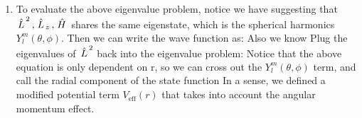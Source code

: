 \documentclass{school-22.101-notes}
\begin{document}
\begin{enumerate}
\item To evaluate the above eigenvalue problem, notice we have
suggesting that $\left. \hat{L} \right.^2, \left. \hat{L} \right._z, \left. \hat{H} \right.$ shares the same eigenstate, which is the spherical harmonics $Y_l^m (\theta, \phi)$. Then we can write the wave function as: 
Also we know 
Plug the eigenvalues of $\left. \hat{L} \right.^2$ back into the eigenvalue problem: 
Notice that the above equation is only dependent on r, so we can cross out the $Y_l^m (\theta, \phi)$ term, and call the radial component of the state function
In a sense, we defined a modified potential term $V_{\mathrm{eff}} (r)$ that takes into account the angular momentum effect.  
\end{enumerate}
\end{document}

